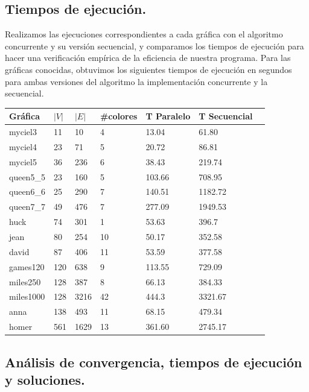 \documentclass{article}
\begin{document}
\subsection{Tiempos de ejecución.}
 Realizamos las ejecuciones correspondientes a cada gráfica con el algoritmo concurrente y su versión secuencial, y comparamos los tiempos de ejecución para hacer una verificación empírica de la eficiencia de nuestra programa.
Para las gráficas conocidas, obtuvimos los siguientes tiempos de ejecución en segundos para ambas versiones del algoritmo la implementación concurrente y la secuencial.

\begin{table}[H]
\centering
\begin{tabular}{|l|l|l|l|l|l|l|}
\hline
Gráfica      & $|V|$& $|E|$&#colores&T Paralelo  & T Secuencial \\ \hline
myciel3   & 11  & 10  & 4 &  13.04  & 61.80 \\ \hline
myciel4   & 23  & 71  & 5 &  20.72  & 86.81 \\ \hline
myciel5   & 36  & 236 & 6 &  38.43  & 219.74 \\ \hline
queen5\_5 & 23  & 160 & 5 &  103.66 & 708.95  \\ \hline
queen6\_6 & 25  & 290 & 7 &  140.51 & 1182.72 \\ \hline
queen7\_7 & 49  & 476 & 7 &  277.09 & 1949.53 \\ \hline
huck      & 74  & 301 & 1 & 53.63   & 396.7 \\ \hline
jean      & 80  & 254 & 10&     50.17   &   352.58 \\ \hline
 david    & 87  & 406 & 11& 53.59   &  377.58 \\ \hline
 games120 &120  & 638 & 9 & 113.55    &    729.09 \\ \hline
 miles250 & 128 & 387 & 8 & 66.13    & 384.33 \\ \hline
 miles1000& 128 & 3216& 42& 444.3   &  3321.67 \\ \hline
anna      & 138 & 493 & 11&  68.15       &  479.34        \\ \hline
homer     & 561 &1629 & 13&    361.60     &   2745.17       \\ \hline

\end{tabular}
\end{table}

\subsection{Análisis de convergencia, tiempos de ejecución y soluciones.}
\end{document}
